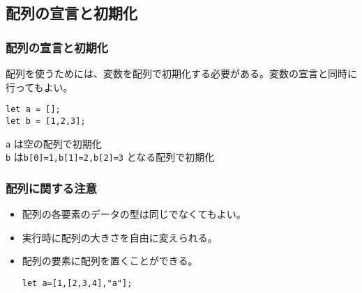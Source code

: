 \subsection{配列の宣言と初期化}
\begin{frame}[containsverbatim]
 \frametitle{配列の宣言と初期化}
配列を使うためには、変数を配列で初期化する必要がある。変数の宣言と同時に
行ってもよい。
\begin{Verbatim}
let a = [];
let b = [1,2,3];
\end{Verbatim}
 \Verb+a+ は空の配列で初期化\\
 \Verb+b+ は\Verb+b[0]=1,b[1]=2,b[2]=3+ となる配列で初期化
\end{frame}
\begin{frame}[containsverbatim]
 \frametitle{配列に関する注意}
\begin{itemize}
 \item 配列の各要素のデータの型は同じでなくてもよい。
 \item 実行時に配列の大きさを自由に変えられる。
 \item 配列の要素に配列を置くことができる。
\begin{Verbatim}
let a=[1,[2,3,4],"a"];
\end{Verbatim}
\end{itemize}
\end{frame}

